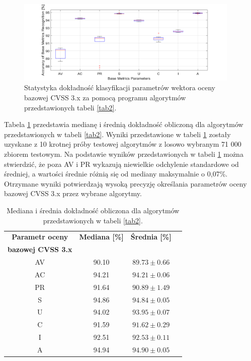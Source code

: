 \begin{figure}[!ht]
\centering
\includegraphics[width=0.95\textwidth]{Chapters/Wplyw/ml_results/Param_Limit_71000_multi_10.png}
\caption{Statystyka dokładność klasyfikacji parametrów wektora oceny bazowej CVSS 3.x za pomocą programu algorytmów przedstawionych tabeli \ref{tab2}.}
\label{fig:wplyw:ml:fig_1}
\end{figure}

\bigbreak
Tabela \ref{tab3} przedstawia medianę i średnią dokładność obliczoną dla algorytmów przedstawionych w tabeli \ref{tab2}. Wyniki przedstawione w tabeli \ref{tab3} zostały uzyskane z 10 krotnej próby testowej algorytmów z losowo wybranym 71 000 zbiorem testowym. Na podstawie wyników przedstawionych w tabeli \ref{tab3} można stwierdzić, że poza AV i PR wykazują niewielkie odchylenie standardowe od średniej, a wartości średnie różnią się od mediany maksymalnie o 0,07\%. Otrzymane wyniki potwierdzają wysoką precyzję określania parametrów oceny bazowej CVSS 3.x przez wybrane algorytmy.

\begin{table}[htbp]
\caption{Mediana i średnia dokładność obliczona dla algorytmów przedstawionych w tabeli \ref{tab2}.}
\begin{center}
\begin{tabular}{cccc}
\hline
\textbf{Parametr oceny} & \textbf{Mediana [\%]}   & \textbf{Średnia [\%]}  \\
\textbf{bazowej CVSS 3.x} & & \\
\hline
AV           & 90.10    & $89.73\pm0.66$     \\
AC           & 94.21    & $94.21\pm0.06$     \\
PR           & 91.64    & $90.89\pm1.49$     \\
S            & 94.86    & $94.84\pm0.05$     \\
U            & 94.02    & $93.95\pm0.07$     \\
C            & 91.59    & $91.62\pm0.29$     \\
I            & 92.51    & $92.53\pm0.11$     \\
A            & 94.94    & $94.90\pm0.05$     \\
\hline
\end{tabular}
\label{tab3}
\end{center}
\end{table}

